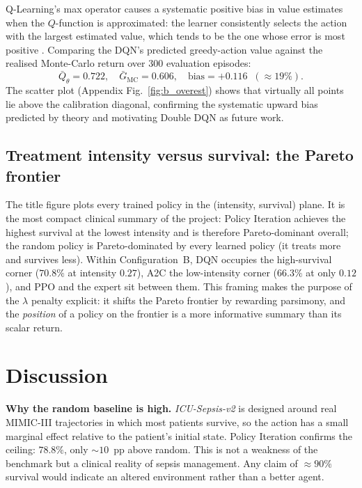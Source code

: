 \documentclass[11pt,a4paper]{article}
\begin{document}
Q-Learning's max operator causes a systematic positive bias in value estimates when
the $Q$-function is approximated: the learner consistently selects the action with
the largest estimated value, which tends to be the one whose error is most positive
\cite{vanhasselt2016}. Comparing the DQN's predicted greedy-action value against
the realised Monte-Carlo return over $300$ evaluation episodes:
\[
  \bar{Q}_\theta = 0.722, \quad \bar{G}_{\text{MC}} = 0.606,
  \quad \text{bias} = +0.116 \;\;(\approx 19\%).
\]
The scatter plot (Appendix Fig.~\ref{fig:b_overest}) shows that virtually all
points lie above the calibration diagonal, confirming the systematic upward bias
predicted by theory and motivating Double DQN as future work.

\subsection{Treatment intensity versus survival: the Pareto frontier}
\label{sec:pareto}

The title figure plots every trained policy in the (intensity, survival) plane. It
is the most compact clinical summary of the project: Policy Iteration achieves the
highest survival at the lowest intensity and is therefore Pareto-dominant overall;
the random policy is Pareto-dominated by every learned policy (it treats more and
survives less). Within Configuration~B, DQN occupies the high-survival corner
($70.8\%$ at intensity $0.27$), A2C the low-intensity corner ($66.3\%$ at only
$0.12$), and PPO and the expert sit between them. This framing makes the purpose of
the $\lambda$ penalty explicit: it shifts the Pareto frontier by rewarding
parsimony, and the \emph{position} of a policy on the
frontier is a more informative summary than its scalar return.


\section{Discussion}
\label{sec:disc}

\textbf{Why the random baseline is high.}
\textit{ICU-Sepsis-v2} is designed around real MIMIC-III trajectories in which
most patients survive, so the action has a small marginal effect relative to the
patient's initial state. Policy Iteration confirms the ceiling: $78.8\%$, only
$\sim10$~pp above random. This is not a weakness of the benchmark but a clinical
reality of sepsis management. Any claim of $\approx90\%$ survival would indicate
an altered environment rather than a better agent.
\end{document}
